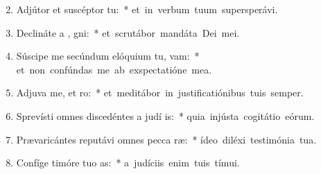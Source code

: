 \begin{flushleft}
\begin{enumerate}[leftmargin=*]
\setcounter{enumi}{1}

\item Adjútor et suscéptor   tu:~* \mbox{et in verbum tuum supersperávi.}
\item Declináte a , gni:~* \mbox{et scrutábor mandáta Dei mei.}
\item Súscipe me secúndum elóquium tu,  vam:~* \mbox{et non confúndas me ab exspectatióne mea.}
\item Adjuva me, et  ro:~* \mbox{et meditábor in justificatiónibus tuis semper.}
\item Sprevísti omnes discedéntes a judí is:~* \mbox{quia injústa cogitátio eórum.}
\item Prævaricántes reputávi omnes pecca ræ:~* \mbox{ídeo diléxi testimónia tua.}
\item Confíge timóre tuo  as:~* \mbox{a judíciis enim tuis tímui.}


\end{enumerate}
\end{flushleft}

